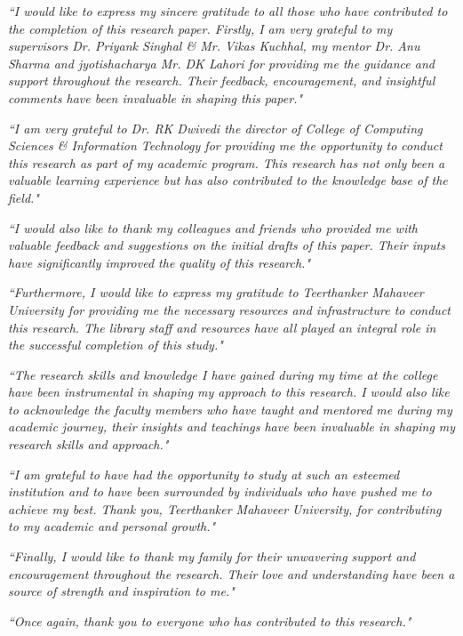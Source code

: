 \textit{``I would like to express my sincere gratitude to all those who have contributed to the completion of this research paper. Firstly, I am very grateful to my supervisors Dr. Priyank Singhal \& Mr. Vikas Kuchhal, my mentor Dr. Anu Sharma and jyotishacharya Mr. DK Lahori for providing me the guidance and support throughout the research. Their feedback, encouragement, and insightful comments have been invaluable in shaping this paper."}

\textit{``I am very grateful to Dr. RK Dwivedi the director of College of Computing Sciences \& Information Technology for providing me the opportunity to conduct this research as part of my academic program. This research has not only been a valuable learning experience but has also contributed to the knowledge base of the field."}

\textit{``I would also like to thank my colleagues and friends who provided me with valuable feedback and suggestions on the initial drafts of this paper. Their inputs have significantly improved the quality of this research."}

\textit{``Furthermore, I would like to express my gratitude to Teerthanker Mahaveer University for providing me the necessary resources and infrastructure to conduct this research. The library staff and resources have all played an integral role in the successful completion of this study."}

\textit{``The research skills and knowledge I have gained during my time at the college have been instrumental in shaping my approach to this research. I would also like to acknowledge the faculty members who have taught and mentored me during my academic journey, their insights and teachings have been invaluable in shaping my research skills and approach."}

\textit{``I am grateful to have had the opportunity to study at such an esteemed institution and to have been surrounded by individuals who have pushed me to achieve my best. Thank you, Teerthanker Mahaveer University, for contributing to my academic and personal growth."}

\textit{``Finally, I would like to thank my family for their unwavering support and encouragement throughout the research. Their love and understanding have been a source of strength and inspiration to me."}

\textit{``Once again, thank you to everyone who has contributed to this research."}

